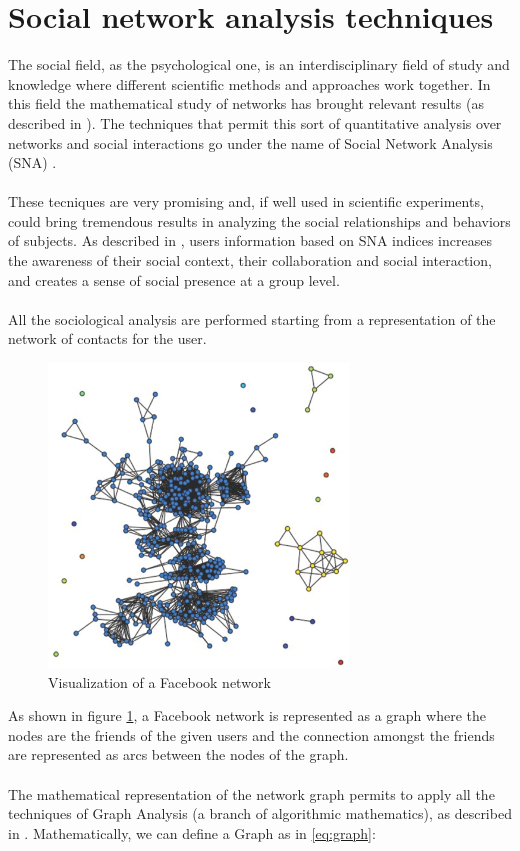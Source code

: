 \section{Social network analysis techniques}
The social ﬁeld, as the psychological one, is an interdisciplinary ﬁeld of study and knowledge where different scientiﬁc methods and approaches work together.
In this ﬁeld the mathematical study of networks has brought relevant results (as described in \cite{Wassermann-1994}).
The techniques that permit this sort of quantitative analysis over networks and social interactions go under the name of Social Network Analysis (SNA) \cite{Butts-2005}.\\
\\
These tecniques are very promising and, if well used in scientiﬁc experiments, could bring tremendous results in analyzing the social relationships and behaviors
of subjects.
As described in \cite{Martino-2007}, users information based on SNA indices increases the awareness of their social context, their collaboration and social interaction,
and creates a sense of social presence at a group level.\\
\\
All the sociological analysis are performed starting from a representation of the network of contacts for the user.

\begin{figure}[h]
\centering
\includegraphics[width=8cm]{Fig1fbnetwork.eps}
\caption{Visualization of a Facebook network}
\label{fig:FBNetwork}
\end{figure}

As shown in figure \ref{fig:FBNetwork}, a Facebook network is represented as a graph where the nodes are the friends of the given users and the connection amongst the
friends are represented as arcs between the nodes of the graph.\\
\\
The mathematical representation of the network graph permits to apply all the techniques of Graph Analysis (a branch of algorithmic mathematics), as described in
\cite{Biggs-1999}.
Mathematically, we can deﬁne a Graph as in \ref{eq:graph}:\\

